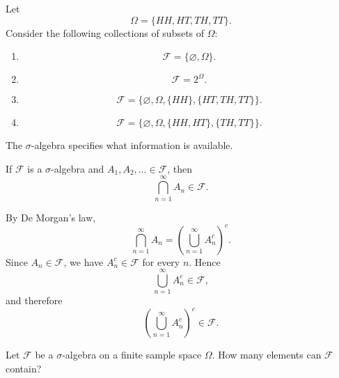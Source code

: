\begin{exampleenv}
    Let
    $$
    \Omega=\{HH,HT,TH,TT\}.
    $$
    Consider the following collections of subsets of $\Omega$:
    \begin{enumerate}[label=(\arabic*)]
        \item
        $$
        \mathcal{F}=\{\varnothing,\Omega\}.
        $$

        \item
        $$
        \mathcal{F}=2^{\Omega}.
        $$

        \item
        $$
        \mathcal{F}
        =\bigl\{\varnothing,\Omega,\{HH\},\{HT,TH,TT\}\bigr\}.
        $$

        \item
        $$
        \mathcal{F}
        =\bigl\{\varnothing,\Omega,\{HH,HT\},\{TH,TT\}\bigr\}.
        $$
    \end{enumerate}
    The $\sigma$-algebra specifies what information is available.
\end{exampleenv}

\begin{propositionenv}
    If $\mathcal{F}$ is a $\sigma$-algebra and
    $A_1,A_2,\ldots\in\mathcal{F}$, then
    $$
    \bigcap_{n=1}^{\infty} A_n\in\mathcal{F}.
    $$
\end{propositionenv}

\begin{proofenv}
    By De Morgan's law,
    $$
    \bigcap_{n=1}^{\infty} A_n
    =\left(\bigcup_{n=1}^{\infty} A_n^c\right)^c.
    $$
    Since $A_n\in\mathcal{F}$, we have $A_n^c\in\mathcal{F}$ for every $n$.
    Hence
    $$
    \bigcup_{n=1}^{\infty} A_n^c\in\mathcal{F},
    $$
    and therefore
    $$
    \left(\bigcup_{n=1}^{\infty} A_n^c\right)^c\in\mathcal{F}.
    $$
\end{proofenv}

\begin{exerciseenv}
    Let $\mathcal{F}$ be a $\sigma$-algebra on a finite sample space $\Omega$.
    How many elements can $\mathcal{F}$ contain?
\end{exerciseenv}

